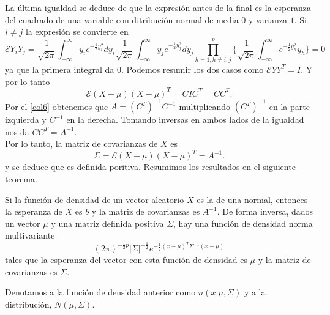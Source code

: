 La última igualdad se deduce de que la expresión antes de la final es la esperanza del cuadrado de una variable con ditribución normal de media $0$ y varianza $1$. Si $i\neq j$ la expresión se convierte en
\[ \mathcal{E}Y_iY_j= \frac{1}{\sqrt{2\pi}} \int_{-\infty}^{\infty} y_ie^{-\frac{1}{2}y_i^2} dy_i \frac{1}{\sqrt{2\pi}} \int_{-\infty}^{\infty} y_je^{-\frac{1}{2}y_j^2} dy_j \prod_{h=1,h\neq i,j}^p \lbrace \frac{1}{\sqrt{2\pi}} \int_{-\infty}^{\infty} e^{-\frac{1}{2}y_h^2} y_h \rbrace = 0\]
ya que la primera integral da $0$. Podemos resumir los dos casos como $\mathcal{E}YY^T=I$. Y por lo tanto
\[ \mathcal{E}(X-\mu)(X-\mu)^T=CIC^T=CC^T. \]
Por el \autoref{col6} obtenemos que $A=(C^T)^{-1}C^{-1}$ multiplicando $(C^T)^{-1}$ en la parte izquierda y $C^{-1}$ en la derecha. Tomando inversas en ambos lados de la igualdad nos da $CC^T=A^{-1}$.\\
Por lo tanto, la matriz de covarianzas de $X$ es
\[ \Sigma=\mathcal{E}(X-\mu)(X-\mu)^T=A^{-1}. \]
y se deduce que es definida poritiva. Resumimos los resultados en el siguiente teorema.
\begin{teorema}
Si la función de densidad de un vector aleatorio $X$ es la de una normal, entonces la esperanza de $X$ es $b$ y la matriz de covarianzas es $A^{-1}$. De forma inversa, dados un vector $\mu$ y una matriz definida positiva $\Sigma$, hay una función de densidad norma multivariante 
\[ (2\pi)^{-\frac{1}{2}p} \vert \Sigma \vert^{-\frac{1}{2}}e^{-\frac{1}{2}(x-\mu)^T \Sigma^{-1} (x-\mu)} \]
tales que la esperanza del vector con esta función de densidad es $\mu$ y la matriz de covarianzas es $\Sigma$.
\end{teorema}
Denotamos a la función de densidad anterior como $n(x \vert \mu, \Sigma)$ y a la distribución, $N(\mu, \Sigma)$.


































\endinput

